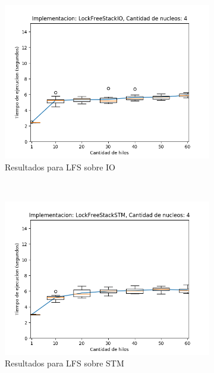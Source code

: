 \begin{appendices}
\begin{figure}[t]
    \begin{subfigure}[b]{0.49\textwidth}
        \includegraphics[width=\textwidth]{images/numberOfThreadsDist/plots/expLFSIO-4}
        \caption{Resultados para LFS sobre IO}
        \label{subfig:numberOfThreadsDist-lfsio-4}
    \end{subfigure}
    ~
    \begin{subfigure}[b]{0.49\textwidth}
        \includegraphics[width=\textwidth]{images/numberOfThreadsDist/plots/expLFSSTM-4}
        \caption{Resultados para LFS sobre STM}
        \label{subfig:numberOfThreadsDist-lfsstm-4}
    \end{subfigure}
    \begin{subfigure}[b]{0.49\textwidth}

\end{subfigure}
\end{figure}
\end{appendices}
